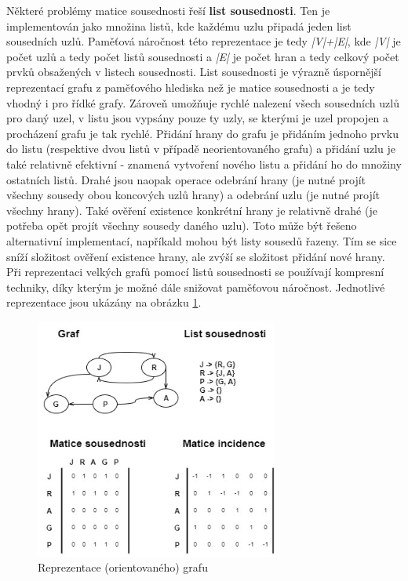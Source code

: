Některé problémy matice sousednosti řeší \textbf{list sousednosti}. Ten je implementován jako množina listů, kde každému uzlu připadá jeden list sousedních uzlů. Paměťová náročnost této reprezentace je tedy \textit{|V|+|E|}, kde \textit{|V|} je počet uzlů a tedy počet listů sousednosti a \textit{|E|} je počet hran a tedy celkový počet prvků obsažených v listech sousednosti. List sousednosti je výrazně úspornější reprezentací grafu z paměťového hlediska než je matice sousednosti a je tedy vhodný i pro řídké grafy. Zároveň umožňuje rychlé nalezení všech sousedních uzlů pro daný uzel, v listu jsou vypsány pouze ty uzly, se kterými je uzel propojen a procházení grafu je tak rychlé. Přidání hrany do grafu je přidáním jednoho prvku do listu (respektive dvou listů v případě neorientovaného grafu) a přidání uzlu je také relativně efektivní - znamená vytvoření nového listu a přidání ho do množiny ostatních listů. Drahé jsou naopak operace odebrání hrany (je nutné projít všechny sousedy obou koncových uzlů hrany) a odebrání uzlu (je nutné projít všechny hrany). Také ověření existence konkrétní hrany je relativně drahé (je potřeba opět projít všechny sousedy daného uzlu). Toto může být řešeno alternativní implementací, napříkald mohou být listy sousedů řazeny. Tím se sice sníží složitost ověření existence hrany, ale zvýší se složitost přidání nové hrany.
Při reprezentaci velkých grafů pomocí listů sousednosti se používají kompresní techniky, díky kterým je možné dále snižovat paměťovou náročnost.\cite{Boldi04} Jednotlivé reprezentace jsou ukázány na obrázku \ref{fig:reprezentace}.

\begin{figure}
\begin{center}
\includegraphics[width=8cm]{figures/graph_reprezentation}
\caption{Reprezentace (orientovaného) grafu}
\label{fig:reprezentace}
\end{center}
\end{figure}

